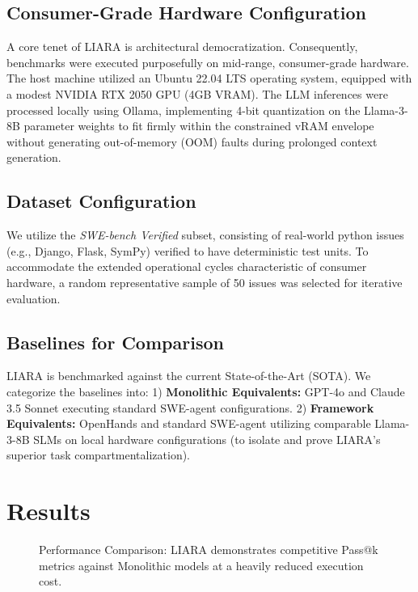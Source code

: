 \documentclass[10pt,journal,compsoc]{IEEEtran}
\begin{document}
\subsection{Consumer-Grade Hardware Configuration}
A core tenet of LIARA is architectural democratization. Consequently, benchmarks were executed purposefully on mid-range, consumer-grade hardware. The host machine utilized an Ubuntu 22.04 LTS operating system, equipped with a modest NVIDIA RTX 2050 GPU (4GB VRAM). The LLM inferences were processed locally using Ollama, implementing 4-bit quantization on the Llama-3-8B parameter weights to fit firmly within the constrained vRAM envelope without generating out-of-memory (OOM) faults during prolonged context generation.

\subsection{Dataset Configuration}
We utilize the \textit{SWE-bench Verified} subset, consisting of real-world python issues (e.g., Django, Flask, SymPy) verified to have deterministic test units. To accommodate the extended operational cycles characteristic of consumer hardware, a random representative sample of 50 issues was selected for iterative evaluation.

\subsection{Baselines for Comparison}
LIARA is benchmarked against the current State-of-the-Art (SOTA). We categorize the baselines into:
1) \textbf{Monolithic Equivalents:} GPT-4o and Claude 3.5 Sonnet executing standard SWE-agent configurations.
2) \textbf{Framework Equivalents:} OpenHands and standard SWE-agent utilizing comparable Llama-3-8B SLMs on local hardware configurations (to isolate and prove LIARA's superior task compartmentalization).

\section{Results}
\label{sec:results}
\begin{figure}[!t]
\centering
\caption{Performance Comparison: LIARA demonstrates competitive Pass@k metrics against Monolithic models at a heavily reduced execution cost.}
\label{fig_results}
\end{figure}
\end{document}
